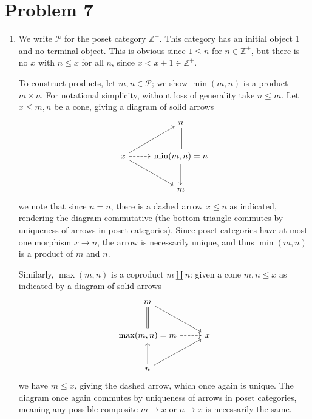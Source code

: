 \documentclass[11pt, letterpaper]{article}
\begin{document}
\section{Problem 7}
\begin{enumerate}
	\item We write $\mathcal{P} $ for the poset category $\mathbb{Z} ^+$. This category has an initial object 1 and no terminal object. This is obvious since $1\leq n$ for $n\in\mathbb{Z} ^+$, but there is no $x$ with $n\leq x$ for all $n$, since $x < x+1 \in\mathbb{Z} ^+$.

		To construct products, let $m,n\in\mathcal{P} $; we show $\min(m,n)$ is a product $m\times n$. For notational simplicity, without loss of generality take $n\leq m$. Let $x\leq m,n$ be a cone, giving a diagram of solid arrows
		\[\begin{tikzcd}[row sep = 2.5em, column sep = 2.5em]
		 & n \\
		x\ar[ur] \ar[dr] \ar[dashed, r]  & \min (m,n)=n\ar[equals, u] \ar[d]  \\
		 & m
		\end{tikzcd}\]
		we note that since $n=n$, there is a dashed arrow $x\leq n$ as indicated, rendering the diagram commutative (the bottom triangle commutes by uniqueness of arrows in poset categories). Since poset categories have at most one morphism $x\to n$, the arrow is necessarily unique, and thus $\min (m,n)$ is a product of $m$ and $n$.

		Similarly, $\max (m,n)$ is a coproduct $m\amalg n$: given a cone $m,n \leq x$ as indicated by a diagram of solid arrows
		\[\begin{tikzcd}[row sep = 2.5em, column sep = 2.5em]
		m \ar[equals, d]\ar[dr]   &  \\
		\max (m,n)=m\ar[dashed, r]  & x \\
		n\ar[u] \ar[ur]  & 
		\end{tikzcd}\]
		we have $m\leq x$, giving the dashed arrow, which once again is unique. The diagram once again commutes by uniqueness of arrows in poset categories, meaning any possible composite $m\to x$ or $n\to x$ is necessarily the same.


\end{enumerate}
\end{document}
